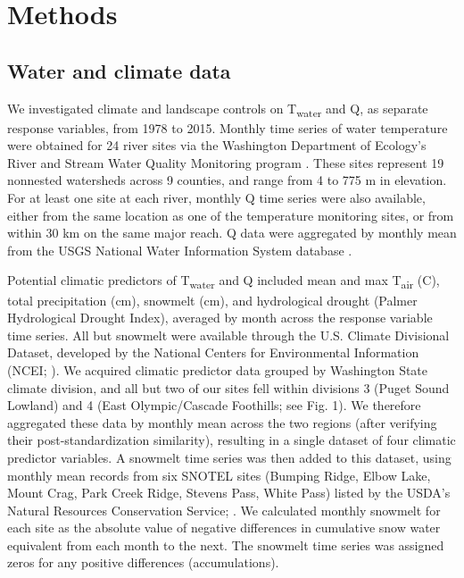 \documentclass[notitlepage]{article}
\begin{document}
\section*{Methods}

\subsection*{Water and climate data}

We investigated climate and landscape controls on T\textsubscript{water} and Q, as separate response variables, from 1978 to 2015. Monthly time series of water temperature were obtained for 24 river sites via the Washington Department of Ecology's River and Stream Water Quality Monitoring program \citep{DoEwaterData}. These sites represent 19 nonnested watersheds across 9 counties, and range from 4 to 775 m in elevation. For at least one site at each river, monthly Q time series were also available, either from the same location as one of the temperature monitoring sites, or from within 30 km on the same major reach. Q data were aggregated by monthly mean from the USGS National Water Information System database \citep{USGSdischarge}.

Potential climatic predictors of T\textsubscript{water} and Q included mean and max T\textsubscript{air} (\degree C), total precipitation (cm), snowmelt (cm), and hydrological drought (Palmer Hydrological Drought Index), averaged by month across the response variable time series. All but snowmelt were available through the U.S. Climate Divisional Dataset, developed by the National Centers for Environmental Information (NCEI; \citealt{climateData}). We acquired climatic predictor data grouped by Washington State climate division, and all but two of our sites fell within divisions 3 (Puget Sound Lowland) and 4 (East Olympic/Cascade Foothills; see Fig. 1). We therefore aggregated these data by monthly mean across the two regions (after verifying their post-standardization similarity), resulting in a single dataset of four climatic predictor variables. A snowmelt time series was then added to this dataset, using monthly mean records from six SNOTEL sites (Bumping Ridge, Elbow Lake, Mount Crag, Park Creek Ridge, Stevens Pass, White Pass) listed by the USDA's Natural Resources Conservation Service; \citealt{snowData}. We calculated monthly snowmelt for each site as the absolute value of negative differences in cumulative snow water equivalent from each month to the next. The snowmelt time series was assigned zeros for any positive differences (accumulations).
\end{document}
